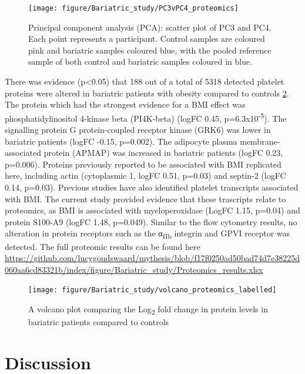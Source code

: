 \documentclass[11pt,twoside]{bristolthesis}
\begin{document}
\begin{figure}
\texttt{[image: figure/Bariatric\_study/PC3vPC4\_proteomics]} \caption[Principal component analysis (PCA): scatter plot of PC3 and PC4.]{Principal component analysis (PCA): scatter plot of PC3 and PC4. Each point represents a participant. Control samples are coloured pink and bariatric samples coloured blue, with the pooled reference sample of both control and bariatric samples coloured in blue.}\label{fig:pca2}
\end{figure}
There was evidence (p\textless0.05) that 188 out of a total of 5318 detected platelet proteins were altered in bariatric patients with obesity compared to controls \ref{fig:volcano}. The protein which had the strongest evidence for a BMI effect was phosphatidylinositol 4-kinase beta (PI4K-beta) (logFC 0.45, p=6.3x10\textsuperscript{-5}). The signalling protein G protein-coupled receptor kinase (GRK6) was lower in bariatric patients (logFC -0.15, p=0.002). The adipocyte plasma membrane-associated protein (APMAP) was increased in bariatric patients (logFC 0.23, p=0.006). Proteins previously reported to be associated with BMI replicated here, including actin (cytoplasmic 1, logFC 0.51, p=0.03) and septin-2 (logFC 0.14, p=0.03). Previous studies have also identified platelet transcripts associated with BMI. The current study provided evidence that these trascripts relate to proteomics, as BMI is associated with myeloperoxidase (LogFC 1.15, p=0.04) and protein S100-A9 (logFC 1.48, p=0.049). Similar to the flow cytometry results, no alteration in protein receptors such as the α\textsubscript{IIb} integrin and GPVI receptor was detected. The full proteomic results can be found here \url{https://github.com/lucygoudswaard/mythesis/blob/f17f0250ad50bad74d7e38225d060aa6cd83321b/index/figure/Bariatric_study/Proteomics_results.xlsx}



\begin{figure}
\texttt{[image: figure/Bariatric\_study/volcano\_proteomics\_labelled]} \caption[A volcano plot comparing the Log\textsubscript{2} fold change in protein levels in bariatric patients compared to controls]{A volcano plot comparing the Log\textsubscript{2} fold change in protein levels in bariatric patients compared to controls}\label{fig:volcano}
\end{figure}
\hypertarget{discussion-1}{%
\section{Discussion}\label{discussion-1}}
\end{document}
